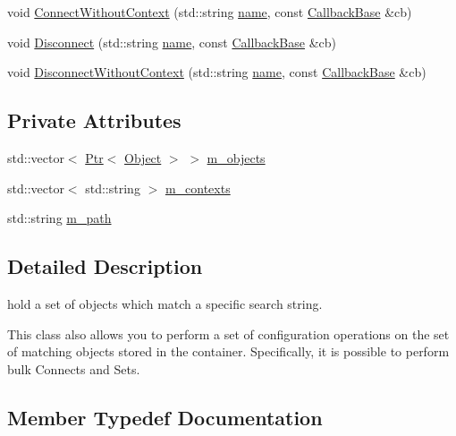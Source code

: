 \begin{DoxyCompactItemize}
\item 
void \hyperlink{classns3_1_1Config_1_1MatchContainer_abde4278558c2fca751704264381e75da}{Connect\+Without\+Context} (std\+::string \hyperlink{generate__test__data__lte__spectrum__model_8m_ab74e6bf80237ddc4109968cedc58c151}{name}, const \hyperlink{classns3_1_1CallbackBase}{Callback\+Base} \&cb)
\item 
void \hyperlink{classns3_1_1Config_1_1MatchContainer_a578a5f5f24f309ae52c44643b99943c6}{Disconnect} (std\+::string \hyperlink{generate__test__data__lte__spectrum__model_8m_ab74e6bf80237ddc4109968cedc58c151}{name}, const \hyperlink{classns3_1_1CallbackBase}{Callback\+Base} \&cb)
\item 
void \hyperlink{classns3_1_1Config_1_1MatchContainer_a3fd31a2eda5b3ae7fc88fcad86a4de06}{Disconnect\+Without\+Context} (std\+::string \hyperlink{generate__test__data__lte__spectrum__model_8m_ab74e6bf80237ddc4109968cedc58c151}{name}, const \hyperlink{classns3_1_1CallbackBase}{Callback\+Base} \&cb)
\end{DoxyCompactItemize}
\subsection*{Private Attributes}
\begin{DoxyCompactItemize}
\item 
std\+::vector$<$ \hyperlink{classns3_1_1Ptr}{Ptr}$<$ \hyperlink{classns3_1_1Object}{Object} $>$ $>$ \hyperlink{classns3_1_1Config_1_1MatchContainer_aeb80622a6ac767130a2ef3b27419beee}{m\+\_\+objects}
\item 
std\+::vector$<$ std\+::string $>$ \hyperlink{classns3_1_1Config_1_1MatchContainer_afdcb16d3c587db9e4d6765e41221b3c2}{m\+\_\+contexts}
\item 
std\+::string \hyperlink{classns3_1_1Config_1_1MatchContainer_aa9fbedce767ff9ac6fb590175b0cc445}{m\+\_\+path}
\end{DoxyCompactItemize}


\subsection{Detailed Description}
hold a set of objects which match a specific search string. 

This class also allows you to perform a set of configuration operations on the set of matching objects stored in the container. Specifically, it is possible to perform bulk Connects and Sets. 

\subsection{Member Typedef Documentation}
